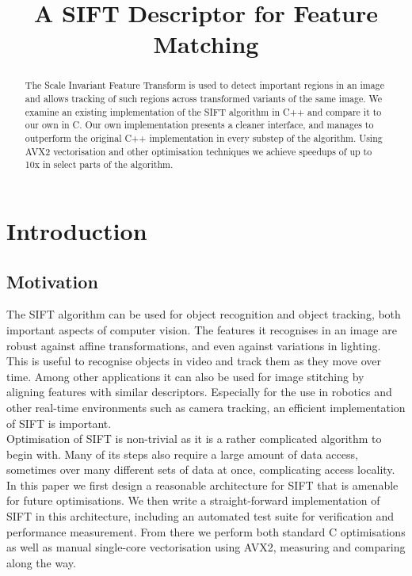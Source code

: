 \documentclass[letterpaper]{article}
\title{A SIFT Descriptor for Feature Matching}
\begin{document}
\maketitle

\begin{abstract}
The Scale Invariant Feature Transform is used to detect important regions in an image and allows tracking of such regions across transformed variants of the same image. We examine an existing implementation of the SIFT algorithm in C++ and compare it to our own in C. Our own implementation presents a cleaner interface, and manages to outperform the original C++ implementation in every substep of the algorithm. Using AVX2 vectorisation and other optimisation techniques we achieve speedups of up to 10x in select parts of the algorithm.
\end{abstract}

\section{Introduction}\label{sec:intro}
\subsection*{Motivation}
The SIFT algorithm can be used for object recognition and object tracking, both important aspects of computer vision. The features it recognises in an image are robust against affine transformations, and even against variations in lighting. This is useful to recognise objects in video and track them as they move over time. Among other applications it can also be used for image stitching by aligning features with similar descriptors. Especially for the use in robotics and other real-time environments such as camera tracking, an efficient implementation of SIFT is important. \\

Optimisation of SIFT is non-trivial as it is a rather complicated algorithm to begin with. Many of its steps also require a large amount of data access, sometimes over many different sets of data at once, complicating access locality. \\

In this paper we first design a reasonable architecture for SIFT that is amenable for future optimisations. We then write a straight-forward implementation of SIFT in this architecture, including an automated test suite for verification and performance measurement. From there we perform both standard C optimisations as well as manual single-core vectorisation using AVX2, measuring and comparing along the way.
\end{document}
